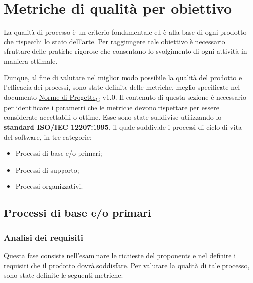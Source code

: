 \section{Metriche di qualità per obiettivo}
La qualità di processo è un criterio fondamentale ed è alla base di ogni prodotto
che rispecchi lo stato dell'arte. Per raggiungere tale obiettivo è necessario
sfruttare delle pratiche rigorose che consentano lo svolgimento di ogni attività
in maniera ottimale.

Dunque, al fine di valutare nel miglior modo possibile la qualità del prodotto e l'efficacia dei processi, sono state definite delle metriche, meglio specificate nel documento \href{https://7last.github.io/docs/rtb/documentazione-interna/glossario#norme-di-progetto}{Norme di Progetto\textsubscript{G}} v1.0. Il contenuto di
questa sezione è necessario per identificare i parametri che le metriche devono rispettare per essere considerate accettabili o ottime.
Esse sono state suddivise utilizzando lo \textbf{standard ISO/IEC 12207:1995}, il quale suddivide i processi di ciclo di vita del software, in tre categorie:
\begin{itemize}
	\item Processi di base e/o primari;
	\item Processi di supporto;
	\item Processi organizzativi.
\end{itemize}

\subsection{Processi di base e/o primari}
\subsubsection{Analisi dei requisiti}
Questa fase consiste nell'esaminare le richieste del proponente e nel definire i requisiti che il prodotto dovrà soddisfare. Per valutare la qualità di tale processo, sono state definite le seguenti metriche:


